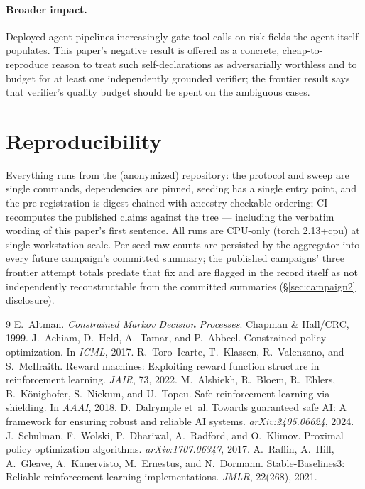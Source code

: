 \documentclass{article}
\begin{document}
\paragraph{Broader impact.} Deployed agent pipelines increasingly gate tool calls on risk fields the agent itself populates. This paper's negative result is offered as a concrete, cheap-to-reproduce reason to treat such self-declarations as adversarially worthless and to budget for at least one independently grounded verifier; the frontier result says that verifier's quality budget should be spent on the ambiguous cases.

\section{Reproducibility}

Everything runs from the (anonymized) repository: the protocol and sweep are single commands, dependencies are pinned, seeding has a single entry point, and the pre-registration is digest-chained with ancestry-checkable ordering; CI recomputes the published claims against the tree --- including the verbatim wording of this paper's first sentence. All runs are CPU-only (torch 2.13+cpu) at single-workstation scale. Per-seed raw counts are persisted by the aggregator into every future campaign's committed summary; the published campaigns' three frontier attempt totals predate that fix and are flagged in the record itself as not independently reconstructable from the committed summaries (\S\ref{sec:campaign2} disclosure).

\begin{thebibliography}{9}
 E.~Altman. \textit{Constrained Markov Decision Processes}. Chapman \& Hall/CRC, 1999.
 J.~Achiam, D.~Held, A.~Tamar, and P.~Abbeel. Constrained policy optimization. In \textit{ICML}, 2017.
 R.~Toro~Icarte, T.~Klassen, R.~Valenzano, and S.~McIlraith. Reward machines: Exploiting reward function structure in reinforcement learning. \textit{JAIR}, 73, 2022.
 M.~Alshiekh, R.~Bloem, R.~Ehlers, B.~K{\"o}nighofer, S.~Niekum, and U.~Topcu. Safe reinforcement learning via shielding. In \textit{AAAI}, 2018.
 D.~Dalrymple et~al. Towards guaranteed safe AI: A framework for ensuring robust and reliable AI systems. \textit{arXiv:2405.06624}, 2024.
 J.~Schulman, F.~Wolski, P.~Dhariwal, A.~Radford, and O.~Klimov. Proximal policy optimization algorithms. \textit{arXiv:1707.06347}, 2017.
 A.~Raffin, A.~Hill, A.~Gleave, A.~Kanervisto, M.~Ernestus, and N.~Dormann. Stable-Baselines3: Reliable reinforcement learning implementations. \textit{JMLR}, 22(268), 2021.
\end{thebibliography}
\end{document}
